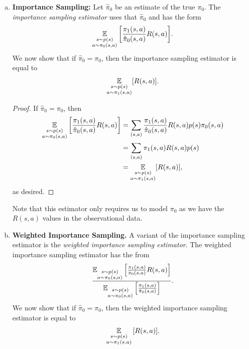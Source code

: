 \documentclass[12pt,letterpaper,boxed]{hmcpset}
\begin{document}
\begin{solution}
  \begin{enumerate}[(a)]
    \item \textbf{Importance Sampling:} Let $\hat \pi_0$ be an estimate of the true $\pi_0$. The \emph{importance sampling estimator} uses that $\hat \pi_0$ and has the form 
    \[
    \operatorname*{\mathbb{E}}_{\substack{s \sim p(s) \\ a \sim \pi_0 (s,a)}} \qty[\frac{\pi_1(s,a)}{\hat \pi_0 (s,a)} R(s,a)].
    \]
    We now show that if $\hat \pi_0 = \pi_0$, then the importance sampling estimator is equal to 
    \[
    \operatorname*{\mathbb{E}}_{\substack{s \sim p(s) \\ a \sim \pi_1(s,a)}} [R(s,a)].
    \]
    
    \begin{proof}
      If $\hat \pi_0 = \pi_0$, then
      \[
      \begin{aligned}
        \operatorname*{\mathbb{E}}_{\substack{s \sim p(s) \\ a \sim \pi_0 (s,a)}} \qty[\frac{\pi_1(s,a)}{\hat \pi_0 (s,a)} R(s,a)] &= 
        \sum_{(s,a)} \frac{\pi_1(s,a)}{\hat \pi_0 (s,a)} R(s,a) p(s) \pi_0 (s,a) \\
        &= \sum_{(s,a)} \pi_1(s,a) R(s,a) p(s) \\
        &= \operatorname*{\mathbb{E}}_{\substack{s \sim p(s) \\ a \sim \pi_1(s,a)}} [R(s,a)],
      \end{aligned}
      \]
      as desired.
    \end{proof}
    Note that this estimator only requires us to model $\pi_0$ as we have the $R(s,a)$ values in the observational data.

    \item \textbf{Weighted Importance Sampling.} A variant of the importance sampling estimator is the \emph{weighted importance sampling estimator}. The weighted importance sampling estimator has the from
    \[
    \frac{\operatorname*{\mathbb{E}}_{\substack{s \sim p(s) \\ a \sim \pi_0 (s,a)}}\qty[\frac{\pi_1(s,a)}{\hat \pi_0 (s,a)} R(s,a)] }{ \operatorname*{\mathbb{E}}_{\substack{s \sim p(s) \\ a \sim \pi_0 (s,a)}}\qty[\frac{\pi_1(s,a)}{\hat \pi_0 (s,a)}] }.
    \]
    We now show that if $\hat \pi_0 = \pi_0$, then the weighted importance sampling estimator is equal to 
    \[
    \operatorname*{\mathbb{E}}_{\substack{s \sim p(s) \\ a \sim \pi_1(s,a)}} \qty[R(s,a)].
    \]


\end{enumerate}
\end{solution}
\end{document}
